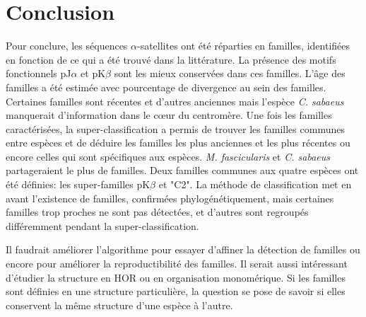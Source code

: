 \documentclass[12pt,a4paper]{article}
\begin{document}
\section{Conclusion}
	Pour conclure, les séquences  $\alpha$-satellites ont été réparties en familles, identifiées en fonction de ce qui a été trouvé dans la littérature. La présence des motifs fonctionnels pJ$\alpha$ et pK$\beta$ sont les mieux conservées dans ces familles. L'âge des familles a été estimée avec pourcentage de divergence au sein des familles. Certaines familles sont récentes et d'autres anciennes mais l'espèce \textit{C. sabaeus} manquerait d'information dans le cœur du centromère. Une fois les familles caractérisées, la super-classification a permis de trouver les familles communes entre espèces et de déduire les familles les plus anciennes et les plus récentes ou encore celles qui sont spécifiques aux espèces. \textit{M. fascicularis} et \textit{C. sabaeus} partageraient le plus de familles. Deux familles communes aux quatre espèces ont été définies: les super-familles pK$\beta$ et "C2". La méthode de classification met en avant l'existence de familles, confirmées phylogénétiquement, mais certaines familles trop proches ne sont pas détectées, et d'autres sont regroupés différemment pendant la super-classification. 
	
	Il faudrait améliorer l'algorithme pour essayer d'affiner la détection de familles ou encore pour améliorer la reproductibilité des familles. Il serait aussi intéressant  d'étudier la structure en HOR ou en organisation monomérique. Si les familles sont définies en une structure particulière, la question se pose de savoir si elles conservent la même structure d'une espèce à l'autre.



\strut  ~  \mbox{}  \null
\newpage
\thispagestyle{empty}


\thispagestyle{empty} 

\newpage 
\thispagestyle{empty}
\end{document}
